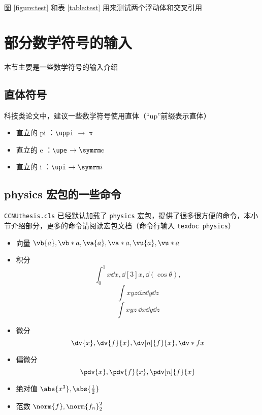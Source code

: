 图 \ref{figure:test} 和表 \ref{table:test} 用来测试两个浮动体和交叉引用



\section{部分数学符号的输入}

本节主要是一些数学符号的输入介绍


\subsection{直体符号}

科技类论文中，建议一些数学符号使用直体（“up”前缀表示直体）
  \begin{itemize}
    \item 直立的 pi ：\verb|\uppi| $\to \uppi$
    \item 直立的 e ：\verb|\upe| $\to \upe$
    \item 直立的 i ：\verb|\upi| $\to \upi$
  \end{itemize}



\subsection{physics 宏包的一些命令}

\verb|CCNUthesis.cls| 已经默认加载了 \verb|physics| 宏包，提供了很多很方便的命令，本小节介绍部分，更多的命令请阅读宏包文档（命令行输入 \verb|texdoc physics|）

\begin{itemize}
  \item 向量 $\vb{a}, \vb*{a}, \va{a}, \va*{a}, \vu{a}, \vu*{a}$
  \item 积分
    \[
      \int_{0}^{1} x \dd{x},
      \dd[3]{x}, \dd(\cos\theta),
    \]
    \[
      \int xyz \dd{x} \dd{y} \dd{z}
    \]
    \[
      \int xyz \ \dd x \dd y \dd z    
    \]
  \item 微分
    \[
      \dv{x}, \dv{f}{x}, \dv[n]{f}{x}, \dv*{f}{x}
    \]
  \item 偏微分
    \[
      \pdv{x}, \pdv{f}{x}, \pdv[n]{f}{x}
    \]
  \item 绝对值 $\abs{x^3}, \abs{\frac{1}{2}}$
  \item 范数 $\norm{f}, \norm{f_n}_{2}^{2}$
\end{itemize}



